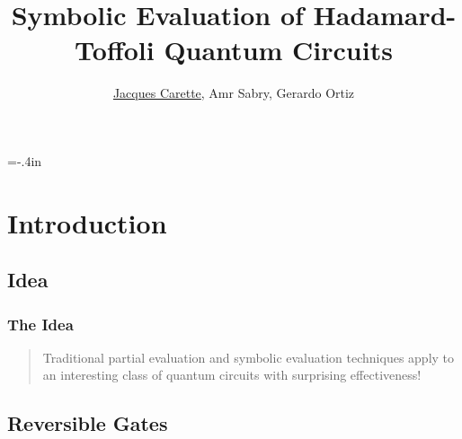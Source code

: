 \documentclass{beamer}
\title[\pgfuseimage{logo}] %
{Symbolic Evaluation of Hadamard-Toffoli Quantum Circuits}
\author[]{\underline{Jacques Carette}, Amr Sabry, Gerardo Ortiz}
\begin{document}
\hoffset=-.4in %
\begin{frame}[plain]

\titlepage

\end{frame}
\hoffset=0in %


\section[Introduction]{Introduction}

\subsection[Idea]{Idea}

\begin{frame}
  \frametitle{The Idea}

  \begin{quote}
Traditional partial evaluation and symbolic evaluation techniques
apply to an interesting class of quantum circuits with surprising effectiveness!
    \end{quote}

  \end{frame}

\subsection[Reversible]{Reversible Gates}
\end{document}
